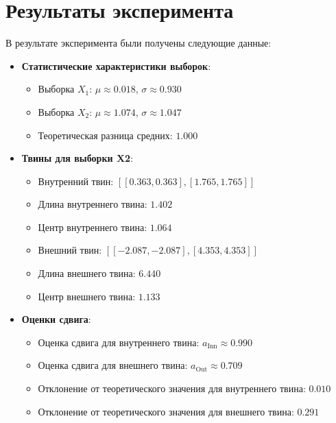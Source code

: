 \documentclass[a4paper]{article}
\begin{document}
    \section{Результаты эксперимента}
    В результате эксперимента были получены следующие данные:

    \begin{itemize}
        \item \textbf{Статистические характеристики выборок}:
        \begin{itemize}
            \item Выборка \(X_1\): \(\mu \approx 0.018\), \(\sigma \approx 0.930\)
            \item Выборка \(X_2\): \(\mu \approx 1.074\), \(\sigma \approx 1.047\)
            \item Теоретическая разница средних: \(1.000\)
        \end{itemize}

        \item \textbf{Твины для выборки X2}:
        \begin{itemize}
            \item Внутренний твин: \([[0.363, 0.363], [1.765, 1.765]]\)
            \item Длина внутреннего твина: \(1.402\)
            \item Центр внутреннего твина: \(1.064\)
            \item Внешний твин: \([[-2.087, -2.087], [4.353, 4.353]]\)
            \item Длина внешнего твина: \(6.440\)
            \item Центр внешнего твина: \(1.133\)
        \end{itemize}

        \item \textbf{Оценки сдвига}:
        \begin{itemize}
            \item Оценка сдвига для внутреннего твина: \( a_{\text{Inn}} \approx 0.990 \)
            \item Оценка сдвига для внешнего твина: \( a_{\text{Out}} \approx 0.709 \)
            \item Отклонение от теоретического значения для внутреннего твина: \(0.010\)
            \item Отклонение от теоретического значения для внешнего твина: \(0.291\)
        \end{itemize}


\end{itemize}
\end{document}
